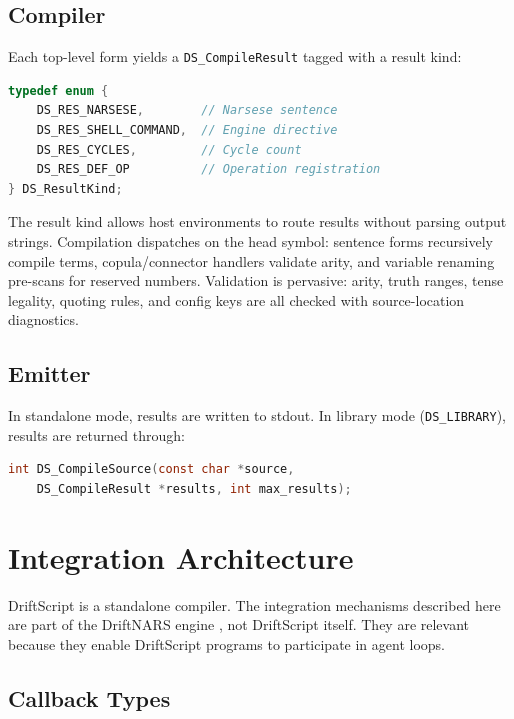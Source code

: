 \documentclass[11pt,a4paper]{article}
\begin{document}
\subsection{Compiler}

Each top-level form yields a \texttt{DS\_CompileResult} tagged with a result
kind:

\begin{lstlisting}[language=C]
typedef enum {
    DS_RES_NARSESE,        // Narsese sentence
    DS_RES_SHELL_COMMAND,  // Engine directive
    DS_RES_CYCLES,         // Cycle count
    DS_RES_DEF_OP          // Operation registration
} DS_ResultKind;
\end{lstlisting}

The result kind allows host environments to route results without parsing
output strings. Compilation dispatches on the head symbol: sentence forms
recursively compile terms, copula/connector handlers validate arity, and
variable renaming pre-scans for reserved numbers. Validation is pervasive:
arity, truth ranges, tense legality, quoting rules, and config keys are all
checked with source-location diagnostics.

\subsection{Emitter}

In standalone mode, results are written to stdout. In library mode
(\texttt{DS\_LIBRARY}), results are returned through:

\begin{lstlisting}[language=C]
int DS_CompileSource(const char *source,
    DS_CompileResult *results, int max_results);
\end{lstlisting}

\section{Integration Architecture}
\label{sec:integration}

DriftScript is a standalone compiler. The integration mechanisms described
here are part of the DriftNARS engine \citep{brady2024driftnars}, not
DriftScript itself. They are relevant because they enable DriftScript programs
to participate in agent loops.

\subsection{Callback Types}
\end{document}
